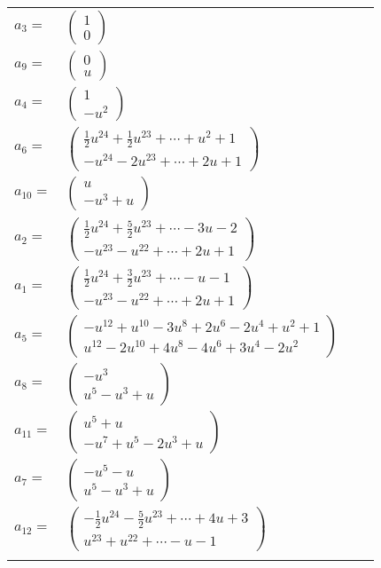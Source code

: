 \documentclass[1p]{elsarticle_modified}
\theoremstyle{definition}
\begin{document}
\begin{tabular}{m{7pt} m{180pt} m{7pt} m{180pt} }
\flushright $a_{3}=$&$\begin{pmatrix}1\\0\end{pmatrix}$ \\
\flushright $a_{9}=$&$\begin{pmatrix}0\\u\end{pmatrix}$ \\
\flushright $a_{4}=$&$\begin{pmatrix}1\\- u^2\end{pmatrix}$ \\
\flushright $a_{6}=$&$\begin{pmatrix}\frac{1}{2} u^{24}+\frac{1}{2} u^{23}+\cdots+u^2+1\\- u^{24}-2 u^{23}+\cdots+2 u+1\end{pmatrix}$ \\
\flushright $a_{10}=$&$\begin{pmatrix}u\\- u^3+u\end{pmatrix}$ \\
\flushright $a_{2}=$&$\begin{pmatrix}\frac{1}{2} u^{24}+\frac{5}{2} u^{23}+\cdots-3 u-2\\- u^{23}- u^{22}+\cdots+2 u+1\end{pmatrix}$ \\
\flushright $a_{1}=$&$\begin{pmatrix}\frac{1}{2} u^{24}+\frac{3}{2} u^{23}+\cdots- u-1\\- u^{23}- u^{22}+\cdots+2 u+1\end{pmatrix}$ \\
\flushright $a_{5}=$&$\begin{pmatrix}- u^{12}+u^{10}-3 u^8+2 u^6-2 u^4+u^2+1\\u^{12}-2 u^{10}+4 u^8-4 u^6+3 u^4-2 u^2\end{pmatrix}$ \\
\flushright $a_{8}=$&$\begin{pmatrix}- u^3\\u^5- u^3+u\end{pmatrix}$ \\
\flushright $a_{11}=$&$\begin{pmatrix}u^5+u\\- u^7+u^5-2 u^3+u\end{pmatrix}$ \\
\flushright $a_{7}=$&$\begin{pmatrix}- u^5- u\\u^5- u^3+u\end{pmatrix}$ \\
\flushright $a_{12}=$&$\begin{pmatrix}-\frac{1}{2} u^{24}-\frac{5}{2} u^{23}+\cdots+4 u+3\\u^{23}+u^{22}+\cdots- u-1\end{pmatrix}$\\&\end{tabular}
\end{document}
